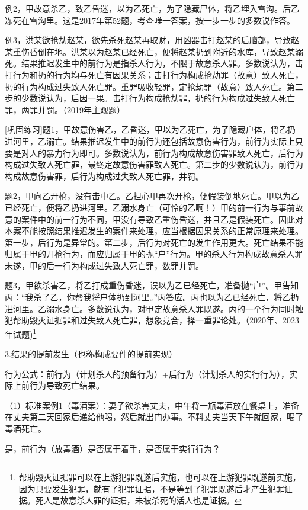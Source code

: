 例2，甲故意杀乙，致乙昏迷，以为乙死亡，为了隐藏尸体，将乙埋入雪沟。后乙冻死在雪沟里。这是2017年第52题，考查唯一答案，按一步一步的多数说作答。

例3，洪某欲抢劫赵某，欲先杀死赵某再取财，用凶器击打赵某的后脑部，导致赵某重伤昏倒在地。洪某以为赵某已经死亡，便将赵某扔到附近的水库，导致赵某溺死。结果推迟发生中的前行为是指杀人行为，不限于故意杀人罪。多数说认为，击打行为和扔的行为均与死亡有因果关系；击打行为构成抢劫罪（故意）致人死亡，扔的行为构成过失致人死亡罪。重罪吸收轻罪，定抢劫罪（故意）致人死亡。第二步的少数说认为，后因一果。击打行为构成抢劫罪，扔的行为构成过失致人死亡罪，两罪并罚。（2019年主观题）

[巩固练习]题1，甲故意伤害乙，乙昏迷，甲以为乙死亡，为了隐藏户体，将乙扔进河里，乙溺亡。结果推迟发生中的前行为还包括故意伤害行为，前行为实际上只要是对人的暴力行为即可。多数说认为，前行为构成故意伤害罪致人死亡，后行为构成过失致人死亡罪，最终定故意伤害罪致人死亡。第二步的少数说认为，前行为构成故意伤害罪，后行为构成过失致人死亡罪，并罚。

题2，甲向乙开枪，没有击中乙。乙担心甲再次开枪，便假装倒地死亡。甲以为乙已经死亡，便将乙扔进河里。乙溺水身亡（可怜的乙啊！）甲的前一行为与事前故意的案件中的前一行为不同，甲没有导致乙重伤昏迷，并且乙是假装死亡。因此对本案不能按照结果推迟发生的案件来处理，应当根据因果关系的正常原理来处理。第一步，后行为是异常的。第二步，后行为对死亡的发生作用更大。死亡结果不能归属于甲的开枪行为，而应归属于甲的抛“户”行为。甲的杀人行为构成故意杀人罪未遂，甲的后一行为构成过失致人死亡罪，数罪并罚。

题3，甲欲杀害乙，将乙打成重伤昏迷，误以为乙已经死亡，准备抛“户”。甲告知丙：“我杀了乙，你帮我将户体扔到河里。”丙答应。丙也以为乙已经死亡，将乙扔进河里。乙溺水身亡。多数说认为，对甲定故意杀人罪既遂。丙的一个行为同时触犯帮助毁灭证据罪和过失致人死亡罪，想象竞合，择一重罪论处。（2020年、2023年试题)\footnote{帮助毁灭证据罪可以在上游犯罪既遂后实施，也可以在上游犯罪既遂前实施，因为只要发生犯罪，就有了犯罪证据，不是等到了犯罪既遂后才产生犯罪证据。死人是故意杀人罪的证据，未被杀死的活人也是证据。}

3.结果的提前发生（也称构成要件的提前实现）

行为公式：前行为（计划杀人的预备行为）+后行为（计划杀人的实行行为），实际上前行为导致死亡结果。

（1）标准案例1（毒酒案）：妻子欲杀害丈夫，中午将一瓶毒酒放在餐桌上，准备在丈夫第二天回家后递给他喝，然后就出门办事。不料丈夫当天下午就回家，喝了毒酒死亡。

是，前行为（放毒酒）是否属于着手，是否属于实行行为？

